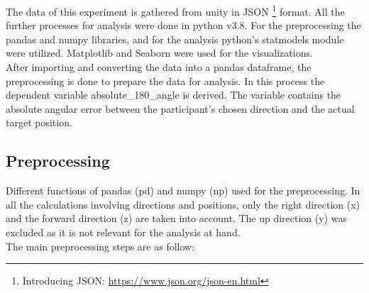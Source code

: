 The data of this experiment is gathered from unity in JSON \footnote{Introducing JSON: \href{https://www.json.org/json-en.html}{https://www.json.org/json-en.html}} format. All the further processes for analysis were done in python \autocite{10.5555/1593511} v3.8. For the preprocessing the pandas \autocite{reback2022pandas, mckinney-proc-scipy-2010} and numpy \autocite{harris2020array} libraries, and for the analysis python's statmodels \autocite{seabold2010statsmodels} module were utilized. Matplotlib \autocite{Hunter:2007} and Seaborn \autocite{Waskom2021} were used for the visualizations.\\

After importing and converting the data into a pandas dataframe, the preprocessing is done to prepare the data for analysis. In this process the dependent variable {\emphasize absolute\_180\_angle} is derived. The variable contains the absolute angular error between the participant's chosen direction and the actual target position. 

\subsection{Preprocessing}

Different functions of pandas {\emphasize (pd)} and numpy {\emphasize (np)} used for the preprocessing. In all the calculations involving directions and positions, only the right direction (x) and the forward direction (z) are taken into account. The up direction (y) was excluded as it is not relevant for the analysis at hand. \\

The main preprocessing steps are as follow:


